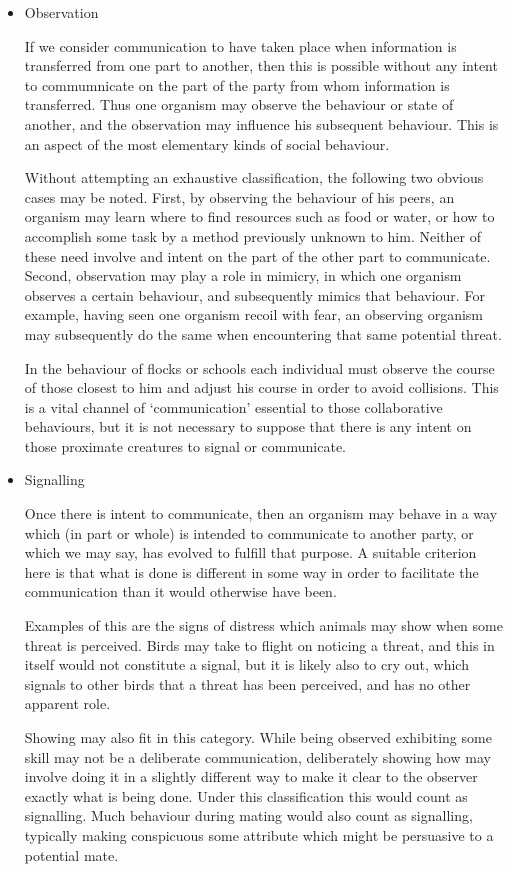 \documentclass[10pt,titlepage]{article}
\begin{document}
\begin{itemize}
\item Observation

  If we consider communication to have taken place when information is transferred from one part to another, then this is possible without any intent to commumnicate on the part of the party from whom information is transferred.
  Thus one organism may observe the behaviour or state of another, and the observation may influence his subsequent behaviour.
  This is an aspect of the most elementary kinds of social behaviour.

  Without attempting an exhaustive classification, the following two obvious cases may be noted.
  First, by observing the behaviour of his peers, an organism may learn where to find resources such as food or water, or how to accomplish some task by a method previously unknown to him.
  Neither of these need involve and intent on the part of the other part to communicate.
  Second, observation may play a role in mimicry, in which one organism observes a certain behaviour, and subsequently mimics that behaviour.
  For example, having seen one organism recoil with fear, an observing organism may subsequently do the same when encountering that same potential threat.

  In the behaviour of flocks or schools each individual must observe the course of those closest to him and adjust his course in order to avoid collisions.
  This is a vital channel of `communication' essential to those collaborative behaviours, but it is not necessary to suppose that there is any intent on those proximate creatures to signal or communicate.

\item Signalling

  Once there is intent to communicate, then an organism may behave in a way which (in part or whole) is intended to communicate to another party, or which we may say, has evolved to fulfill that purpose.
  A suitable criterion here is that what is done is different in some way in order to facilitate the communication than it would otherwise have been.

  Examples of this are the signs of distress which animals may show when some threat is perceived.
  Birds may take to flight on noticing a threat, and this in itself would not constitute a signal, but it is likely also to cry out, which signals to other birds that a threat has been perceived, and has no other apparent role.

  Showing may also fit in this category.
  While being observed exhibiting some skill may not be a deliberate communication, deliberately showing how may involve doing it in a slightly different way to make it clear to the observer exactly what is being done.
  Under this classification this would count as signalling.
  Much behaviour during mating would also count as signalling, typically making conspicuous some attribute which might be persuasive to a potential mate.


\end{itemize}
\end{document}
